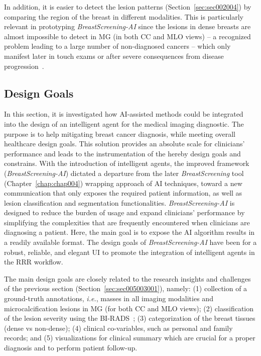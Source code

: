 In addition, it is easier to detect the lesion patterns (Section~\ref{sec:sec002004}) by comparing the region of the breast in different modalities.
This is particularly relevant in prototyping {\it BreastScreening-AI} since the lesions in dense breasts are almost impossible to detect in \ac{MG} (in both \ac{CC} and \ac{MLO} views) -- a recognized problem leading to a large number of non-diagnosed cancers -- which only manifest later in touch exams or after severe consequences from disease progression~\cite{mohamed2018deep}.

\subsection{Design Goals}
\label{sec:sec005003002}

In this section, it is investigated how \ac{AI}-assisted methods could be integrated into the design of an intelligent agent for the medical imaging diagnostic.
The purpose is to help mitigating breast cancer diagnosis, while meeting overall healthcare design goals.
This solution provides an absolute scale for clinicians' performance and leads to the instrumentation of the hereby design goals and constrains.
With the introduction of intelligent agents, the improved framework ({\it BreastScreening-AI}) dictated a departure from the later {\it BreastScreening} tool (Chapter~\ref{chap:chap004}) wrapping approach of \ac{AI} techniques, toward a new communication that only exposes the required patient information, as well as lesion classification and segmentation functionalities.
{\it BreastScreening-AI} is designed to reduce the burden of usage and expand clinicians' performance by simplifying the complexities that are frequently encountered when clinicians are diagnosing a patient.
Here, the main goal is to expose the \ac{AI} algorithm results in a readily available format.
The design goals of {\it BreastScreening-AI} have been for a robust, reliable, and elegant \ac{UI} to promote the integration of intelligent agents in the \ac{RRR} workflow.

The main design goals are closely related to the research insights and challenges of the previous section (Section~\ref{sec:sec005003001}), namely:
(1) collection of a ground-truth annotations, {\it i.e.}, masses in all imaging modalities and microcalcification lesions in \ac{MG} (for both \ac{CC} and \ac{MLO} views);
(2) classification of the lesion severity using the \ac{BI-RADS}~\cite{aghaei2018association};
(3) categorization of the breast tissues (dense vs non-dense);
(4) clinical co-variables, such as personal and family records; and
(5) visualizations for clinical summary which are crucial for a proper diagnosis and to perform patient follow-up.

